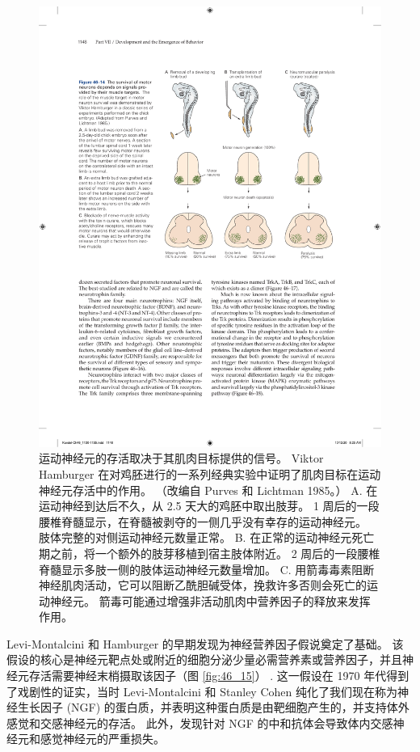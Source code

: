 \begin{figure}[htbp]
	\centering
	\includegraphics[width=0.7\linewidth]{chap46/fig_46_14}
	\caption{运动神经元的存活取决于其肌肉目标提供的信号。 Viktor Hamburger 在对鸡胚进行的一系列经典实验中证明了肌肉目标在运动神经元存活中的作用。 （改编自 Purves 和 Lichtman 1985。） A. 在运动神经到达后不久，从 2.5 天大的鸡胚中取出肢芽。 1 周后的一段腰椎脊髓显示，在脊髓被剥夺的一侧几乎没有幸存的运动神经元。 肢体完整的对侧运动神经元数量正常。 B. 在正常的运动神经元死亡期之前，将一个额外的肢芽移植到宿主肢体附近。 2 周后的一段腰椎脊髓显示多肢一侧的肢体运动神经元数量增加。 C. 用箭毒毒素阻断神经肌肉活动，它可以阻断乙酰胆碱受体，挽救许多否则会死亡的运动神经元。 箭毒可能通过增强非活动肌肉中营养因子的释放来发挥作用。}
	\label{fig:46_14}
\end{figure}

Levi-Montalcini 和 Hamburger 的早期发现为神经营养因子假说奠定了基础。 该假设的核心是神经元靶点处或附近的细胞分泌少量必需营养素或营养因子，并且神经元存活需要神经末梢摄取该因子（图 \ref{fig:46_15}） . 
这一假设在 1970 年代得到了戏剧性的证实，当时 Levi-Montalcini 和 Stanley Cohen 纯化了我们现在称为神经生长因子 (NGF) 的蛋白质，并表明这种蛋白质是由靶细胞产生的，并支持体外感觉和交感神经元的存活。 此外，发现针对 NGF 的中和抗体会导致体内交感神经元和感觉神经元的严重损失。

